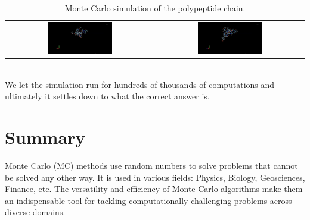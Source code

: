 \documentclass[12pt]{article}
\begin{document}
\begin{table}[h]
\begin{tabular}{cc}
        \includegraphics[width=0.45\textwidth]{figures/ap9.png}
        &         
        \includegraphics[width=0.45\textwidth]{figures/ap10.png}\\
        \end{tabular}
        \caption{Monte Carlo simulation of the polypeptide chain.}
    \end{table}\\
    We let the simulation run for hundreds of thousands of computations and ultimately it settles down to what the correct answer is.

    \section{Summary}
    Monte Carlo (MC) methods use random numbers to solve
    problems that cannot be solved any other way.
    It is used in various fields: Physics, Biology, Geosciences, Finance, etc.
    The versatility and efficiency of Monte Carlo algorithms make them an indispensable tool for tackling computationally challenging problems across diverse domains.
    
    
\end{document}
